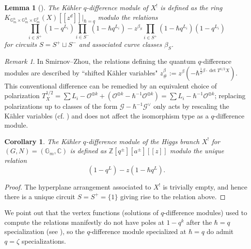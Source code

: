 \documentclass[reqno]{amsart}
\numberwithin{equation}{section}
\numberwithin{equation}{section}
\numberwithin{equation}{section}
\newtheorem{cor}[thm]{Corollary}
\newtheorem{lemma}[thm]{Lemma}
\theoremstyle{definition}
\theoremstyle{remark}
\theoremstyle{remark}
\newtheorem{rem}[thm]{Remark}
\begin{document}
\begin{lemma}[{\cite[Theorem 5.14(1)]{smirnov-zhou}}]\label{lem:kahler-qdiff-computation}
    The K\"ahler $q$-difference module of $X^!$ is defined as the ring $K_{\mathbb{G}_m^n \times \mathbb{G}_m^\hbar \times \mathbb{G}_m^q}(X)[\![z^d]\!]|_{\hbar = q}$ modulo the relations
    \begin{equation}
        \prod_{i \in S^+} (1-q^{L_i}) \prod_{i \in S^-} (1-\hbar q^{L_i}) - z^{\beta_S} \prod_{i \in S^+} (1-\hbar q^{L_i} ) (1-q^{L_i})
    \end{equation} 
    for circuits $S = S^+ \sqcup S^-$ and associated curve classes $\beta_S$.
\end{lemma}
\begin{rem}
    In Smirnov--Zhou, the relations defining the quantum $q$-difference modules are described by ``shifted K\"ahler variables" $z_\#^\beta := z^\beta (-\hbar^{\frac{1}{2}\beta \cdot \det T^{1/2}X})$. This conventional difference can be remedied by an equivalent choice of polarization $T_X^{1/2} = \sum L_i - \mathcal{O}^{\oplus k} + (\mathcal{O}^{\oplus k} -  \hbar^{-1} \mathcal{O}^{\oplus k}) = \sum L_i - \hbar^{-1} \mathcal{O}^{\oplus k}$; replacing polarizations up to classes of the form $\mathcal{G} - \hbar^{-1} \mathcal{G}^\vee$ only acts by rescaling the K\"ahler variables (cf. \cite[7.5.8]{Oko17}) and does not affect the isomorphism type as a $q$-difference module.
\end{rem}

\begin{cor}\label{cor:kahler-qdiff-computation-rank1}
    The K\"ahler $q$-difference module of the Higgs branch $X^!$ for $(G,N) = (\mathbb{G}_m, \mathbb{C})$ is defined as $\mathbb{Z}[q^\pm][a^\pm][\![z]\!]$ modulo the unique relation
    \begin{equation}
        (1-q^L) - z (1- \hbar q^L).
    \end{equation}
\end{cor}
\begin{proof}
    The hyperplane arrangement associated to $X^!$ is trivially empty, and hence there is a unique circuit $S = S^+ = \{1\}$ giving rise to the relation above. 
\end{proof}

We point out that the vertex functions (solutions of $q$-difference modules) used to compute the relations manifestly do not have poles at $1 -q^k$ after the $\hbar=q$ specialization (see \cite[Proposition 5.3]{smirnov-zhou}), so the $q$-difference module specialized at $\hbar = q$ do admit $q = \zeta$ specializations.
\end{document}
